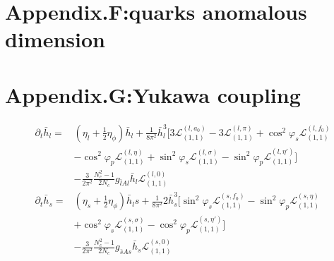 \documentclass[12pt]{article}
\begin{document}
\section{Appendix.F:quarks anomalous dimension}
\section{Appendix.G:Yukawa coupling}
\begin{align}
\partial_t \bar h_l=&(\eta_l+\frac{1}{2}\eta_{\phi})\bar h_l +\frac{1}{8 \pi^2}\bar h_l^3 \big [ 3\mathcal{L}_{(1,1)}^{(l,a_0)} -3 \mathcal{L}_{(1,1)}^{(l,\pi)}
+\cos^2 \varphi_s \mathcal{L}_{(1,1)}^{(l,f_0)}\nonumber\\
&-\cos^2 \varphi_p \mathcal{L}_{(1,1)}^{(l,\eta)}+\sin^2 \varphi_s \mathcal{L}_{(1,1)}^{(l,\sigma)}-\sin^2 \varphi_p \mathcal{L}_{(1,1)}^{(l,\eta')}\big ]\nonumber\\
&-\frac{3}{2\pi^2} \frac{N_c^2-1}{2N_c}g_{\bar l A l} \bar h_l  \mathcal{L}_{(1,1)}^{(l,0)}\\
\partial_t \bar h_s=&(\eta_s+\frac{1}{2}\eta_{\phi})\bar h_ls+\frac{1}{8 \pi^2} 2 \bar h_s^3 \big [   \sin^2 \varphi_s \mathcal{L}_{(1,1)}^{(s,f_0)} -\sin^2 \varphi_p \mathcal{L}_{(1,1)}^{(s,\eta)} \nonumber\\
&+  \cos^2 \varphi_s \mathcal{L}_{(1,1)}^{(s,\sigma)}-  \cos^2 \varphi_p \mathcal{L}_{(1,1)}^{(s,\eta')}\big]\nonumber\\
&-\frac{3}{2\pi^2} \frac{N_c^2-1}{2N_c}g_{\bar s A s} \bar h_s  \mathcal{L}_{(1,1)}^{(s,0)}
\end{align}
\end{document}

